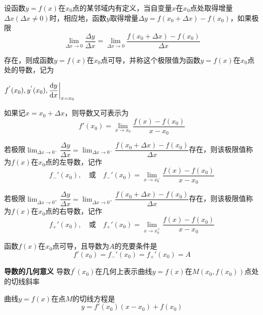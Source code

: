 \begin{definition}[导数定义] \label{def:the_definition_derivative}
设函数$y=f(x)$在$x_0$点的某邻域内有定义，当自变量$x$在$x_0$点处取得增量$\Delta x(\Delta x\neq 0)$时，相应地，函数$y$取得增量$\Delta y = f(x_0+\Delta x)-f(x_0)$，如果极限
\begin{equation}
    \lim_{\Delta x\rightarrow 0}\dfrac{\Delta y}{\Delta x} = \lim_{\Delta x\rightarrow 0} \dfrac{f(x_0+\Delta x)-f(x_0)}{\Delta x}
    \nonumber
\end{equation}

存在，则成函数$y=f(x)$在$x_0$点可导，并称这个极限值为函数$y=f(x)$在$x_0$点处的导数，记为
\vspace{1mm}

$f^{'}(x_0),y^{'}(x_0),\dfrac{\mathrm{d} y}{\mathrm{d} x}\bigg|_{x=x_0}$
\vspace{1mm}

如果记$x=x_0+\Delta x$，则导数又可表示为
\begin{equation}
    f'(x_0) = \lim_{x\rightarrow x_0}\dfrac{f(x)-f(x_0)}{x-x_0}
    \nonumber
\end{equation}

若极限$\displaystyle\lim_{\Delta x\rightarrow0^-}\dfrac{\Delta y}{\Delta x} = \lim_{\Delta x\rightarrow0^-}\dfrac{f(x_0+\Delta x)-f(x_0)}{\Delta x}$存在，则该极限值称为$f(x)$在$x_0$点的左导数，记作
\begin{equation}
    f_{-}'(x_0), \quad \mbox{或} \quad f_{-}'(x_0)=\lim_{x\rightarrow x_0^-}\dfrac{f(x)-f(x_0)}{x-x_0}
    \nonumber
\end{equation}

若极限$\displaystyle\lim_{\Delta x\rightarrow 0^+}\dfrac{\Delta y}{\Delta x}=\lim_{\Delta x\rightarrow0^+}\dfrac{f(x_0+\Delta x)-f(x_0)}{\Delta x}$存在，则该极限值称为$f(x)$在$x_0$点的右导数，记作
\begin{equation}
    f_{+}'(x_0), \quad \mbox{或} \quad f_{+}'(x_0)=\lim_{x\rightarrow x_0^+}\dfrac{f(x)-f(x_0)}{x-x_0}
    \nonumber
\end{equation}

函数$f(x)$在$x_0$点可导，且导数为$A$的充要条件是
\begin{equation}
    f'(x_0)=f_{-}'(x_0)=f_{+}'(x_0)=A 
    \nonumber
\end{equation}
\end{definition}

\textbf{导数的几何意义} \quad 导数$f^{'}(x_0)$在几何上表示曲线$y=f(x)$在$M(x_0,f(x_0))$点处的切线斜率

曲线$y=f(x)$在点$M$的切线方程是
\begin{equation}
    y=f'(x_0)(x-x_0)+f(x_0)
    \nonumber
\end{equation}

